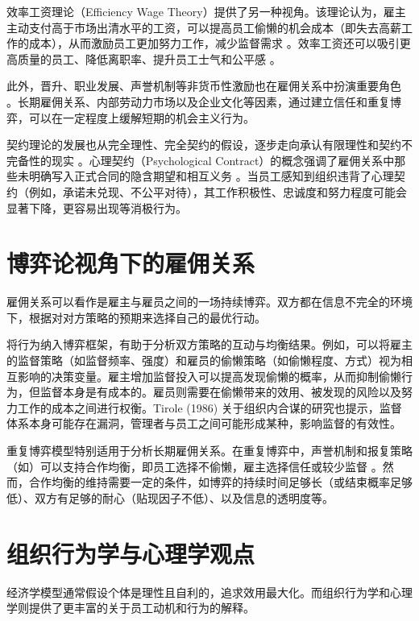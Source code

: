 效率工资理论（Efficiency Wage Theory）提供了另一种视角。该理论认为，雇主主动支付高于市场出清水平的工资，可以提高员工偷懒的机会成本（即失去高薪工作的成本），从而激励员工更加努力工作，减少监督需求 \citep{shapiro1984equilibrium}。效率工资还可以吸引更高质量的员工、降低离职率、提升员工士气和公平感 \citep{akerlof1986efficiency}。

此外，晋升、职业发展、声誉机制等非货币性激励也在雇佣关系中扮演重要角色 \citep{fama1980agency, gibbons1999careers}。长期雇佣关系、内部劳动力市场以及企业文化等因素，通过建立信任和重复博弈，可以在一定程度上缓解短期的机会主义行为。

契约理论的发展也从完全理性、完全契约的假设，逐步走向承认有限理性和契约不完备性的现实 \citep{hart1995firms}。心理契约（Psychological Contract）的概念强调了雇佣关系中那些未明确写入正式合同的隐含期望和相互义务 \citep{rousseau1995psychological}。当员工感知到组织违背了心理契约（例如，承诺未兑现、不公平对待），其工作积极性、忠诚度和努力程度可能会显著下降，更容易出现等消极行为。

\section{博弈论视角下的雇佣关系}

雇佣关系可以看作是雇主与雇员之间的一场持续博弈。双方都在信息不完全的环境下，根据对对方策略的预期来选择自己的最优行动。

将行为纳入博弈框架，有助于分析双方策略的互动与均衡结果。例如，可以将雇主的监督策略（如监督频率、强度）和雇员的偷懒策略（如偷懒程度、方式）视为相互影响的决策变量。雇主增加监督投入可以提高发现偷懒的概率，从而抑制偷懒行为，但监督本身是有成本的。雇员则需要在偷懒带来的效用、被发现的风险以及努力工作的成本之间进行权衡。Tirole (1986) \nocite{tirole1986hierarchies} 关于组织内合谋的研究也提示，监督体系本身可能存在漏洞，管理者与员工之间可能形成某种，影响监督的有效性。

重复博弈模型特别适用于分析长期雇佣关系。在重复博弈中，声誉机制和报复策略（如）可以支持合作均衡，即员工选择不偷懒，雇主选择信任或较少监督 \citep{axelrod1984evolution}。然而，合作均衡的维持需要一定的条件，如博弈的持续时间足够长（或结束概率足够低）、双方有足够的耐心（贴现因子不低）、以及信息的透明度等。

\section{组织行为学与心理学观点}

经济学模型通常假设个体是理性且自利的，追求效用最大化。而组织行为学和心理学则提供了更丰富的关于员工动机和行为的解释。

